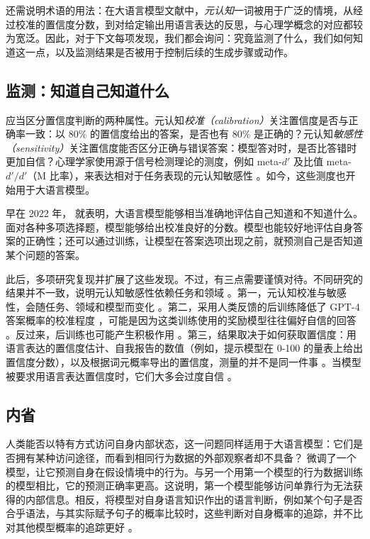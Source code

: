 还需说明术语的用法：在大语言模型文献中，\emph{元认知}一词被用于广泛的情境，从经过校准的置信度分数，到对给定输出用语言表达的反思，与心理学概念的对应都较为宽泛。因此，对于下文每项发现，我们都会询问：究竟监测了什么，我们如何知道这一点，以及监测结果是否被用于控制后续的生成步骤或动作。

\subsection{监测：知道自己知道什么}
应当区分置信度判断的两种属性。元认知\emph{校准（calibration）}关注置信度是否与正确率一致：以 80\% 的置信度给出的答案，是否也有 80\% 是正确的？元认知\emph{敏感性（sensitivity）}关注置信度能否区分正确与错误答案：模型答对时，是否比答错时更加自信？心理学家使用源于信号检测理论的测度，例如 meta-$d'$ 及比值 meta-$d'/d'$（M 比率），来表达相对于任务表现的元认知敏感性 \citep{maniscalco2012signal}。如今，这些测度也开始用于大语言模型。

早在 2022 年，\citet{kadavath2022language} 就表明，大语言模型能够相当准确地评估自己知道和不知道什么。面对各种多项选择题，模型能够给出校准良好的分数。模型也能较好地评估自身答案的正确性；还可以通过训练，让模型在答案选项出现之前，就预测自己是否知道某个问题的答案。

此后，多项研究复现并扩展了这些发现。不过，有三点需要谨慎对待。不同研究的结果并不一致，说明元认知敏感性依赖任务和领域 \citep{liu2026metacog}。第一，元认知校准与敏感性，会随任务、领域和模型而变化 \citep{liu2026metacog}。第二，采用人类反馈的后训练降低了 GPT-4 答案概率的校准程度 \citep{openai2024gpt4}，可能是因为这类训练使用的奖励模型往往偏好自信的回答 \citep{leng2025taming}。反过来，后训练也可能产生积极作用 \citep{lindsey2025introspection}。第三，结果取决于如何获取置信度：用语言表达的置信度估计、自我报告的数值（例如，提示模型在 0-100 的量表上给出置信度分数），以及根据词元概率导出的置信度，测量的并不是同一件事 \citep{liu2026metacog}。当模型被要求用语言表达置信度时，它们大多会过度自信 \citep{xiong2024can}。

\subsection{内省}
人类能否以特有方式访问自身内部状态，这一问题同样适用于大语言模型：它们是否拥有某种访问途径，而看到相同行为数据的外部观察者却不具备？\citet{binder2024looking} 微调了一个模型，让它预测自身在假设情境中的行为。与另一个用第一个模型的行为数据训练的模型相比，它的预测正确率更高。这说明，第一个模型能够访问单靠行为无法获得的内部信息。相反，将模型对自身语言知识作出的语言判断，例如某个句子是否合乎语法，与其实际赋予句子的概率比较时，这些判断对自身概率的追踪，并不比对其他模型概率的追踪更好 \citep{song2025languagemodelsfailintrospect}。

